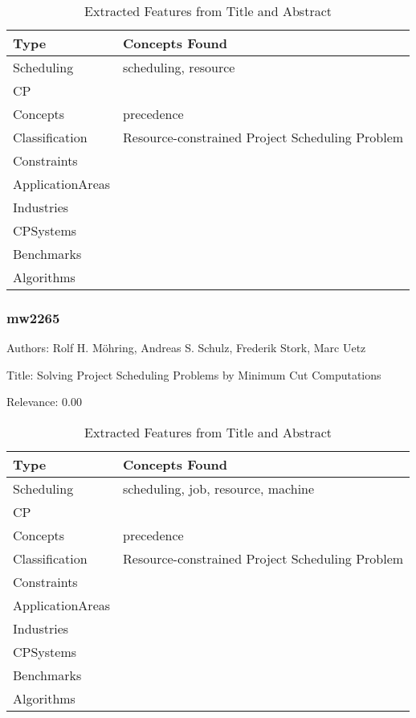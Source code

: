 {\scriptsize
\begin{longtable}{p{2cm}p{20cm}}
\caption{Extracted Features from Title and Abstract}\\ \toprule
Type & Concepts Found\\ \midrule
\endhead
\bottomrule
\endfoot
Scheduling & scheduling, resource\\ 
CP & \\ 
Concepts & precedence\\ 
Classification & Resource-constrained Project Scheduling Problem\\ 
Constraints & \\ 
ApplicationAreas & \\ 
Industries & \\ 
CPSystems & \\ 
Benchmarks & \\ 
Algorithms & \\ 
\end{longtable}
}



\subsubsection{mw2265}
\label{mw:mw2265}

Authors: Rolf H. Möhring, Andreas S. Schulz, Frederik Stork, Marc Uetz

Title: Solving Project Scheduling Problems by Minimum Cut Computations

Relevance:  0.00

{\scriptsize
\begin{longtable}{p{2cm}p{20cm}}
\caption{Extracted Features from Title and Abstract}\\ \toprule
Type & Concepts Found\\ \midrule
\endhead
\bottomrule
\endfoot
Scheduling & scheduling, job, resource, machine\\ 
CP & \\ 
Concepts & precedence\\ 
Classification & Resource-constrained Project Scheduling Problem\\ 
Constraints & \\ 
ApplicationAreas & \\ 
Industries & \\ 
CPSystems & \\ 
Benchmarks & \\ 
Algorithms & \\ 
\end{longtable}
}

